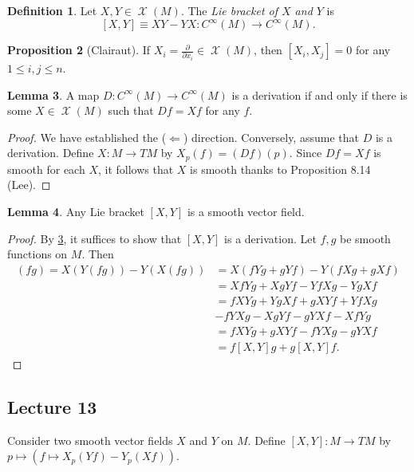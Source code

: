 \documentclass[10pt,letterpaper,cm]{nupset}
\theoremstyle{definition}
\newtheorem{definition}{Definition}[subsection]
\theoremstyle{theorem}
\newtheorem{lemma}[definition]{Lemma}
\newtheorem{prop}[definition]{Proposition}
\theoremstyle{remark}
\newcommand{\1}{\mathbf{1}}
\newcommand{\0}{\vec 0}
\DeclareMathOperator{\vf}{\mathscr{X}}
\begin{document}
\begin{definition}
Let $X, Y \in \vf(M)$. The \textit{Lie bracket of $X$ and $Y$} is $$[X, Y] \equiv  XY - YX : C^{\infty}(M)\to C^{\infty}(M).$$
\end{definition}

\begin{prop}[Clairaut]
If $X_i = \frac{\partial}{\partial{x_i}}\in \vf(M)$, then $\left[X_i, X_j\right] = 0$ for any $1\leq i,j \leq n$.
\end{prop}

\begin{lemma}\label{deriv}
A map $D: C^{\infty}(M) \to C^{\infty}(M)$ is a derivation if and only if there is some $X \in \vf(M)$ such that $Df = Xf$ for any $f$.
\end{lemma}
\begin{proof}
We have established the ($\Longleftarrow$) direction. Conversely, assume that $D$ is a derivation. Define $X : M \to TM$ by $X_p(f) = (Df)(p)$. Since $Df = Xf$ is smooth for each $X$, it follows that $X$ is smooth thanks to Proposition 8.14 (Lee).
\end{proof}

\begin{lemma}
Any Lie bracket $[X, Y]$ is a smooth vector field.
\end{lemma}
\begin{proof}
By \cref{deriv}, it suffices to show that $[X, Y]$ is a derivation. Let $f, g$ be smooth functions on $M$. Then
\begin{align*}
 [X, Y](fg) = X(Y(fg)) - Y(X(fg)) & =  X(fYg + gYf) - Y(fXg + gXf) 
 \\ & = XfYg + XgYf - YfXg - YgXf 
 \\ & = fXYg + YgXf + gXYf + YfXg 
 \\ & - fYXg - XgYf - gYXf - XfYg 
 \\ & = fXYg + gXYf - fYXg - gYXf 
 \\ & = f[X,Y]g + g[X,Y]f
.\end{align*}
\end{proof}

\subsection{Lecture 13}


Consider two smooth vector fields $X$ and $Y$ on $M$. Define $[X, Y] : M \to TM$ by $p\mapsto \left(f \mapsto X_p(Yf) - Y_p(Xf)\right)$.
\end{document}
